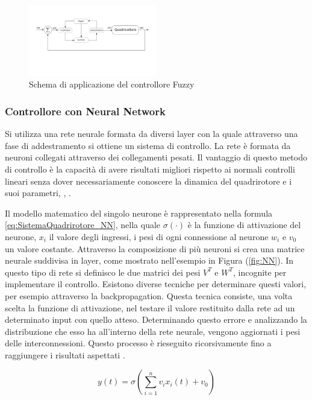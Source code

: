 \begin{figure}
	\centering
	\includegraphics[width=0.5\textwidth]{SistemaQuadrirotore/Figure/Fuzzy}
	\caption{Schema di applicazione del controllore Fuzzy}
\end{figure}

\subsubsection{Controllore con Neural Network}

Si utilizza una rete neurale formata da diversi layer con la quale attraverso una fase di addestramento si ottiene un sistema di controllo. La rete è formata da neuroni collegati attraverso dei collegamenti pesati. Il vantaggio di questo metodo di controllo è la capacità di avere risultati migliori rispetto ai normali controlli lineari senza dover necessariamente conoscere la dinamica del quadrirotore e i suoi parametri, \cite{ZuluAndrew2014ARoC}, \cite{KimJinho2020ACSo}.

Il modello matematico del singolo neurone è rappresentato nella formula \ref{eq:SistemaQuadrirotore_NN}, nella quale $\sigma(\cdot)$ è la funzione di attivazione del neurone, $x_i$ il valore degli ingressi, i pesi di ogni connessione al neurone $w_i$ e $v_0$ un valore costante.
Attraverso la composizione di più neuroni si crea una matrice neurale suddivisa in layer, come mostrato nell'esempio in Figura (\ref{fig:NN}). In questo tipo di rete si definisco le due matrici dei pesi $V^T$ e $W^T$, incognite per implementare il controllo. Esistono diverse tecniche per determinare questi valori, per esempio attraverso la backpropagation.
Questa tecnica consiste, una volta scelta la funzione di attivazione, nel testare il valore restituito dalla rete ad un determinato input con quello atteso. Determinando questo errore e analizzando la distribuzione che esso ha all'interno della rete neurale, vengono aggiornati i pesi delle interconnessioni. Questo processo è rieseguito ricorsivamente fino a raggiungere i risultati aspettati \cite{YesildirakA2020NNCo}.

\begin{equation}\label{eq:SistemaQuadrirotore_NN}
	y(t) = \sigma\left(\sum_{i=1}^{n} v_i x_i(t) + v_0\right)
\end{equation}

